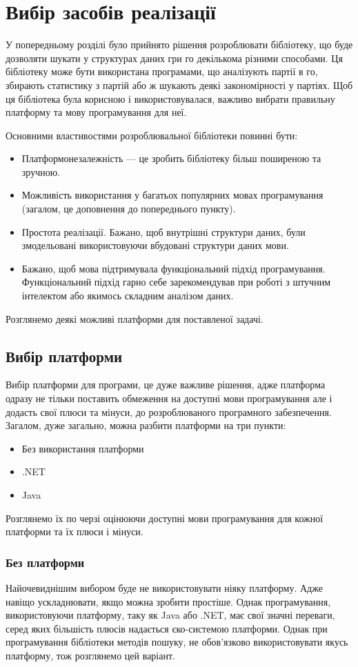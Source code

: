 \newpage
\section{Вибір засобів реалізації}
У попередньому розділі було прийнято рішення розроблювати бібліотеку, що буде дозволяти шукати у структурах даних гри го декількома різними способами. Ця бібліотеку може бути використана програмами, що аналізують партії в го, збирають статистику з партій або ж шукають деякі закономірності у партіях. Щоб ця бібліотека була корисною і використовувалася, важливо вибрати правильну платформу та мову програмування для неї.

Основними властивостями розроблювальної бібліотеки повинні бути:
\begin{itemize}
	\item Платформонезалежність --- це зробить бібліотеку більш поширеною та зручною.
	\item Можливість використання у багатьох популярних мовах програмування (загалом, це доповнення до попереднього пункту).
	\item Простота реалізації. Бажано, щоб внутрішні структури даних, були змодельовані використовуючи вбудовані структури даних мови.
	\item Бажано, щоб мова підтримувала функціональний підхід програмування. Функціональний підхід гарно себе зарекомендував при роботі з штучним інтелектом або якимось складним аналізом даних.
\end{itemize}

Розглянемо деякі можливі платформи для поставленої задачі.
\subsection{Вибір платформи}
Вибір платформи для програми, це дуже важливе рішення, адже платформа одразу не тільки поставить обмеження на доступні мови програмування але і додасть свої плюси та мінуси, до розроблюваного програмного забезпечення. Загалом, дуже загально, можна разбити платформи на три пункти:
\begin{itemize}
	\item Без використання платформи
	\item .NET
	\item Java
\end{itemize}

Розглянемо їх по черзі оцінюючи доступні мови програмування для кожної платформи та їх плюси і мінуси.
\subsubsection{Без платформи}
Найочевиднішим вибором буде не використовувати ніяку платформу. Адже навіщо ускладнювати, якщо можна зробити простіше. Однак програмування, використовуючи платформу, таку як Java або .NET, має свої значні переваги, серед яких більшість плюсів надається єко-системою платформи. Однак при програмування бібліотеки методів пошуку, не обов'язково використовувати якусь платформу, тож розглянемо цей варіант.

